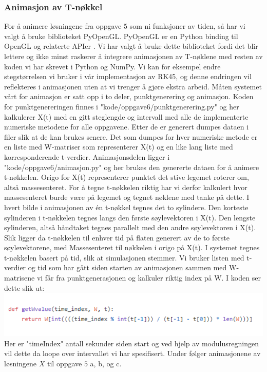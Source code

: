 \subsubsection{Animasjon av T-nøkkel}
For å animere løsningene fra oppgave $5$ som ni funksjoner av tiden, så har vi valgt å bruke biblioteket PyOpenGL. PyOpenGL er en Python binding til OpenGL og relaterte APIer \cite{PYOPENGL:1}. Vi har valgt å bruke dette biblioteket fordi det blir lettere og ikke minst raskerer å integrere animasjonen av T-nøklene med resten av koden vi har skrevet i Python og NumPy. Vi kan for eksempel endre stegstørrelsen vi bruker i vår implementasjon av RK45, og denne endringen vil reflekteres i animasjonen uten at vi trenger å gjøre ekstra arbeid.\newline\newline
Måten systemet vårt for animasjon er satt opp i to deler, punktgenerering og animasjon. Koden for punktgenereringen finnes i "kode/oppgave6/punktgenerering.py" og her kalkulerer X(t) med en gitt steglengde og intervall med alle de implementerte numeriske metodene for alle oppgavene. Etter de er generert dumpes dataen i filer slik at de kan brukes senere. Det som dumpes for hver numeriske metode er en liste med W-matriser som representerer X(t) og en like lang liste med korresponderende t-verdier. \newline\newline Animasjonsdelen ligger i "kode/oppgave6/animasjon.py" og her brukes den genererte dataen for å animere t-nøkkelen. Origo for X(t) representerer punktet det stive legemet roterer om, altså massesenteret. For å tegne t-nøkkelen riktig har vi derfor kalkulert hvor massesenteret burde være på legemet og tegnet nøklene med tanke på dette. I hvert bilde i animasjonen av én t-nøkkel tegnes det to sylindere. Den korteste sylinderen i t-nøkkelen tegnes langs den første søylevektoren i X(t). Den lengste sylinderen, altså håndtaket tegnes parallelt med den andre søylevektoren i X(t). Slik ligger da t-nøkkelen til enhver tid på flaten generert av de to første søylevektorene, med Massesenteret til nøkkelen i origo på X(t). I systemet tegnes t-nøkkelen basert på tid, slik at simulasjonen stemmer. Vi bruker listen med t-verdier og tid som har gått siden starten av animasjonen sammen med W-matrisene vi får fra punktgenerasjonen og kalkuler riktig index på W. I koden ser dette slik ut: \newline 
\includegraphics{rapport/resultat/bilder/get_w_value.PNG}
\newline
Her er "timeIndex" antall sekunder siden start og ved hjelp av modulusregningen vil dette da loope over intervallet vi har spesifisert.\newline\newline
Under følger animasjonene av løsningene $X$ til oppgave $5$ a, b, og c.

